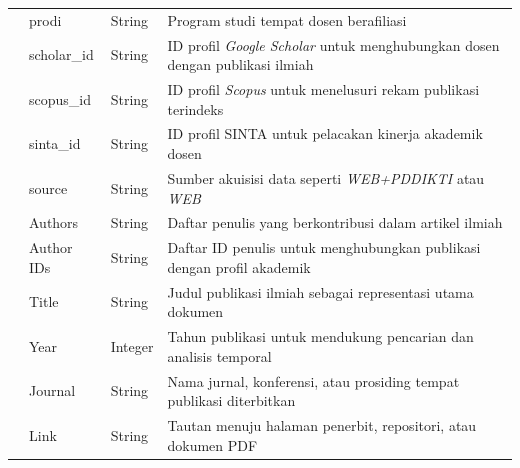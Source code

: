 \begin{longtable}{P{0.14\textwidth}>{\raggedright\arraybackslash}p{0.20\textwidth}P{0.12\textwidth}>{\raggedright\arraybackslash}p{0.40\textwidth}}
                              & prodi                 & String             & Program studi tempat dosen berafiliasi                                              \\ 
                              & scholar\_id           & String             & ID profil \textit{Google Scholar} untuk menghubungkan dosen dengan publikasi ilmiah \\ 
                              & scopus\_id            & String             & ID profil \textit{Scopus} untuk menelusuri rekam publikasi terindeks                \\ 
                              & sinta\_id             & String             & ID profil SINTA untuk pelacakan kinerja akademik dosen                              \\ 
                              & source                & String             & Sumber akuisisi data seperti \textit{WEB+PDDIKTI} atau \textit{WEB}                 \\ 
                              & Authors               & String             & Daftar penulis yang berkontribusi dalam artikel ilmiah                              \\ 
                              & Author IDs            & String             & Daftar ID penulis untuk menghubungkan publikasi dengan profil akademik              \\ 
                              & Title                 & String             & Judul publikasi ilmiah sebagai representasi utama dokumen                           \\ 
                              & Year                  & Integer            & Tahun publikasi untuk mendukung pencarian dan analisis temporal                     \\ 
                              & Journal               & String             & Nama jurnal, konferensi, atau prosiding tempat publikasi diterbitkan                \\ 
                              & Link                  & String             & Tautan menuju halaman penerbit, repositori, atau dokumen PDF                        \\ 

\end{longtable}
